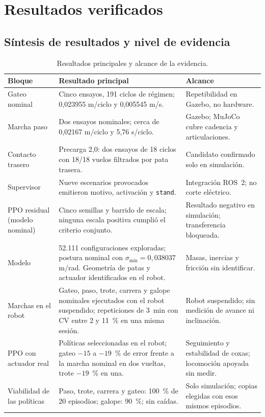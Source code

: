 \chapter{Resultados verificados}

\section{Síntesis de resultados y nivel de evidencia}

\begin{table}[H]
\centering
\caption{Resultados principales y alcance de la evidencia.}
\label{tab:sintesis-resultados}
\small
\begin{tabular}{p{}p{}p{}}
\toprule
Bloque & Resultado principal & Alcance \\
\midrule
Gateo nominal & Cinco ensayos, 191 ciclos de régimen; 0,023955 m/ciclo y 0,005545 m/s. & Repetibilidad en Gazebo, no hardware. \\
Marcha paso & Dos ensayos nominales; cerca de 0,02167 m/ciclo y 5,76 s/ciclo. & Gazebo; MuJoCo cubre cadencia y articulaciones. \\
Contacto trasero & Precarga 2,0: dos ensayos de 18 ciclos con 18/18 vuelos filtrados por pata trasera. & Candidato confirmado solo en simulación. \\
Supervisor & Nueve escenarios provocados emitieron motivo, activación y \texttt{stand}. & Integración ROS~2; no corte eléctrico. \\
PPO residual (modelo nominal) & Cinco semillas y barrido de escala; ninguna escala positiva cumplió el criterio conjunto. & Resultado negativo en simulación; transferencia bloqueada. \\
Modelo & 52.111 configuraciones exploradas; postura nominal con $\sigma_{\min}=0{,}038037$ m/rad. Geometría de patas y actuador identificados en el robot. & Masas, inercias y fricción sin identificar. \\
Marchas en el robot & Gateo, paso, trote, carrera y galope nominales ejecutados con el robot suspendido; repeticiones de 3~min con CV entre 2 y 11~\% en una misma sesión. & Robot suspendido; sin medición de avance ni inclinación. \\
PPO con actuador real & Políticas seleccionadas en el robot; gateo $-15$ a $-19$~\% de error frente a la marcha nominal en dos vueltas, trote $-19$~\% en una. & Seguimiento y estabilidad de coxas; locomoción apoyada sin medir. \\
Viabilidad de las políticas & Paso, trote, carrera y gateo: 100~\% de 20 episodios; galope: 90~\%; sin caídas. & Solo simulación; copias elegidas con esos mismos episodios. \\

\end{tabular}
\end{table}
